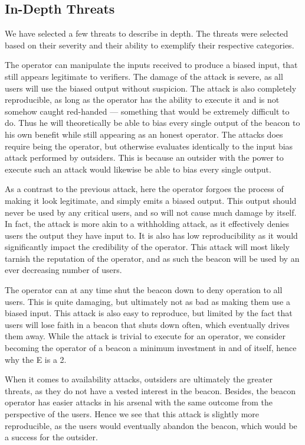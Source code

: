 \subsection{In-Depth Threats}
We have selected a few threats to describe in depth.
The threats were selected based on their severity and their ability to exemplify their respective categories.

The operator can manipulate the inputs received to produce a biased input, that still appears legitimate to verifiers.
The damage of the attack is severe, as all users will use the biased output without suspicion.
The attack is also completely reproducible, as long as the operator has the ability to execute it and is not somehow caught red-handed --- something that would be extremely difficult to do.
Thus he will theoretically be able to bias every single output of the beacon to his own benefit while still appearing as an honest operator.
The attacks does require being the operator, but otherwise evaluates identically to the input bias attack performed by outsiders.
This is because an outsider with the power to execute such an attack would likewise be able to bias every single output.

As a contrast to the previous attack, here the operator forgoes the process of making it look legitimate, and simply emits a biased output.
This output should never be used by any critical users, and so will not cause much damage by itself.
In fact, the attack is more akin to a withholding attack, as it effectively denies users the output they have input to.
It is also has low reproducibility as it would significantly impact the credibility of the operator.
This attack will most likely tarnish the reputation of the operator, and as such the beacon will be used by an ever decreasing number of users.

The operator can at any time shut the beacon down to deny operation to all users.
This is quite damaging, but ultimately not as bad as making them use a biased input.
This attack is also easy to reproduce, but limited by the fact that users will lose faith in a beacon that shuts down often, which eventually drives them away.
While the attack is trivial to execute for an operator, we consider becoming the operator of a beacon a minimum investment in and of itself, hence why the E is a 2.

When it comes to availability attacks, outsiders are ultimately the greater threats, as they do not have a vested interest in the beacon.
Besides, the beacon operator has easier attacks in his arsenal with the same outcome from the perspective of the users.
Hence we see that this attack is slightly more reproducible, as the users would eventually abandon the beacon, which would be a success for the outsider.

